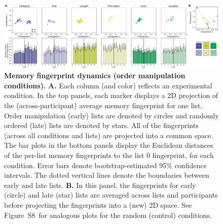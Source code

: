 \documentclass[11pt]{article}
\newcommand{\fingerprintTrajectoryRandom}{S8}
\begin{document}
\begin{figure}[tp] \centering
    \includegraphics[width=\textwidth]{figures/fingerprint_trajectories}
    
    \caption{\textbf{Memory fingerprint dynamics (order manipulation
    conditions).} \textbf{A.} Each column (and color) reflects an experimental
    condition. In the top panels, each marker displays a 2D projection of the
    (across-participant) average memory fingerprint for one list. Order
    manipulation (early) lists are denoted by circles and randomly ordered
    (late) lists are denoted by stars. All of the fingerprints (across all
    conditions and lists) are projected into a common space. The bar plots in
    the bottom panels display the Euclidean distances of the per-list memory
    fingerprints to the list 0 fingerprint, for each condition. Error bars
    denote bootstrap-estimated 95\% confidence intervals. The dotted vertical
    lines denote the boundaries between early and late lists. \textbf{B.} In
    this panel, the fingerprints for early (circle) and late (star) lists are
    averaged across lists and participants before projecting the fingerprints
    into a (new) 2D space. See Figure~\fingerprintTrajectoryRandom~for
    analogous plots for the random (control) conditions. }
    \label{fig:fingerprint-trajectories}
    
    \end{figure}
\end{document}
